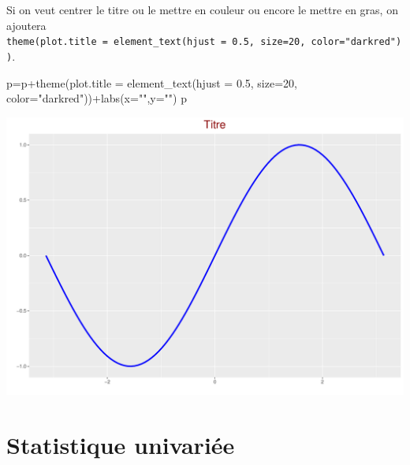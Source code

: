 \documentclass[
  8pt,
  ignorenonframetext,
]{beamer}
\newenvironment{Shaded}{\begin{snugshade}}{\end{snugshade}}
\newcommand{\AttributeTok}[1]{\textcolor[rgb]{0.77,0.63,0.00}{#1}}
\newcommand{\DecValTok}[1]{\textcolor[rgb]{0.00,0.00,0.81}{#1}}
\newcommand{\FloatTok}[1]{\textcolor[rgb]{0.00,0.00,0.81}{#1}}
\newcommand{\FunctionTok}[1]{\textcolor[rgb]{0.00,0.00,0.00}{#1}}
\newcommand{\NormalTok}[1]{#1}
\newcommand{\OtherTok}[1]{\textcolor[rgb]{0.56,0.35,0.01}{#1}}
\newcommand{\SpecialCharTok}[1]{\textcolor[rgb]{0.00,0.00,0.00}{#1}}
\newcommand{\StringTok}[1]{\textcolor[rgb]{0.31,0.60,0.02}{#1}}
\begin{document}
\begin{frame}[fragile]
Si on veut centrer le titre ou le mettre en couleur ou encore le mettre
en gras, on ajoutera
\texttt{theme(plot.title\ =\ element\_text(hjust\ =\ 0.5,\ size=20,\ color="darkred"))}.

\begin{Shaded}
\begin{Highlighting}[]
\NormalTok{p}\OtherTok{=}\NormalTok{p}\SpecialCharTok{+}\FunctionTok{theme}\NormalTok{(}\AttributeTok{plot.title =} \FunctionTok{element\_text}\NormalTok{(}\AttributeTok{hjust =} \FloatTok{0.5}\NormalTok{, }\AttributeTok{size=}\DecValTok{20}\NormalTok{,}
          \AttributeTok{color=}\StringTok{"darkred"}\NormalTok{))}\SpecialCharTok{+}\FunctionTok{labs}\NormalTok{(}\AttributeTok{x=}\StringTok{""}\NormalTok{,}\AttributeTok{y=}\StringTok{""}\NormalTok{)}
\NormalTok{p}
\end{Highlighting}
\end{Shaded}

\begin{center}\includegraphics[height=0.67\textheight]{Chap2_R_files/figure-beamer/unnamed-chunk-12-1} \end{center}
\end{frame}

\hypertarget{statistique-univariuxe9e}{%
\section{Statistique univariée}\label{statistique-univariuxe9e}}
\end{document}
